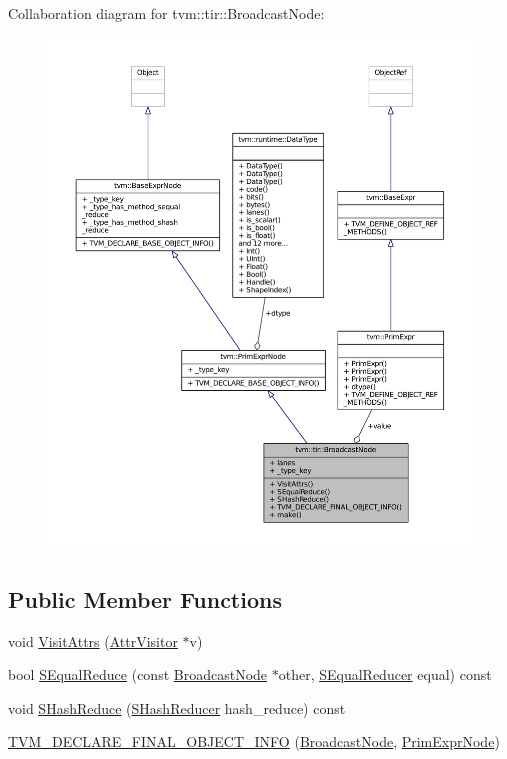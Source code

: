 Collaboration diagram for tvm\+:\+:tir\+:\+:Broadcast\+Node\+:
\nopagebreak
\begin{figure}[H]
\begin{center}
\leavevmode
\includegraphics[width=350pt]{classtvm_1_1tir_1_1BroadcastNode__coll__graph}
\end{center}
\end{figure}
\subsection*{Public Member Functions}
\begin{DoxyCompactItemize}
\item 
void \hyperlink{classtvm_1_1tir_1_1BroadcastNode_a026e3fc65aa96093332df829def152f1}{Visit\+Attrs} (\hyperlink{classtvm_1_1AttrVisitor}{Attr\+Visitor} $\ast$v)
\item 
bool \hyperlink{classtvm_1_1tir_1_1BroadcastNode_ac2a82fc08ca7841339b4bf7330a36580}{S\+Equal\+Reduce} (const \hyperlink{classtvm_1_1tir_1_1BroadcastNode}{Broadcast\+Node} $\ast$other, \hyperlink{classtvm_1_1SEqualReducer}{S\+Equal\+Reducer} equal) const 
\item 
void \hyperlink{classtvm_1_1tir_1_1BroadcastNode_a1c04c5319f89fca5fd60ed7f84726c11}{S\+Hash\+Reduce} (\hyperlink{classtvm_1_1SHashReducer}{S\+Hash\+Reducer} hash\+\_\+reduce) const 
\item 
\hyperlink{classtvm_1_1tir_1_1BroadcastNode_a92870dff9a0739ddb0dbe773f6ba796b}{T\+V\+M\+\_\+\+D\+E\+C\+L\+A\+R\+E\+\_\+\+F\+I\+N\+A\+L\+\_\+\+O\+B\+J\+E\+C\+T\+\_\+\+I\+N\+FO} (\hyperlink{classtvm_1_1tir_1_1BroadcastNode}{Broadcast\+Node}, \hyperlink{classtvm_1_1PrimExprNode}{Prim\+Expr\+Node})
\end{DoxyCompactItemize}
